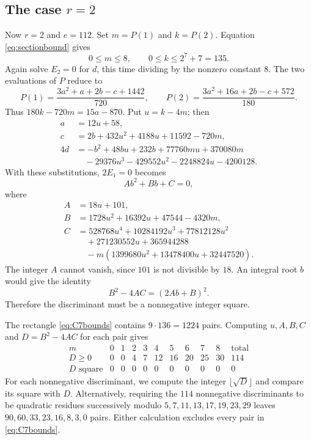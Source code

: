 \documentclass[11pt,reqno,letterpaper]{amsart}
\theoremstyle{definition}
\numberwithin{equation}{section}
\begin{document}
\subsection{The case \texorpdfstring{$r=2$}{r=2}}
Now $r=2$ and $e=112$. Set $m=P(1)$ and $k=P(2)$.
Equation \eqref{eq:sectionbound} gives
\begin{equation}\label{eq:C7bounds}
 0\le m\le8,\qquad 0\le k\le 2^7+7=135.
\end{equation}
Again solve $E_2=0$ for $d$, this time dividing by the nonzero constant $8$.
The two evaluations of $P$ reduce to
\[
 P(1)=\frac{3a^2+a+2b-c+1442}{720},\qquad
 P(2)=\frac{3a^2+16a+2b-c+572}{180}.
\]
Thus $180k-720m=15a-870$. Put $u=k-4m$; then
\begin{align*}
 a&=12u+58,\\
 c&=2b+432u^2+4188u+11592-720m,\\
 4d&=-b^2+48bu+232b+77760mu+370080m\\
    &\quad-29376u^3-429552u^2-2248824u-4200128.
\end{align*}
With these substitutions, $2E_1=0$ becomes
\begin{equation}\label{eq:C7quad}
 A b^2+B b+C=0,
\end{equation}
where
\begin{align*}
 A&=18u+101,\\
 B&=1728u^2+16392u+47544-4320m,\\
 C&=528768u^4+10284192u^3+77812128u^2\\
  &\quad+271230552u+365944288\\
  &\quad-m(1399680u^2+13478400u+32447520).
\end{align*}
The integer $A$ cannot vanish, since $101$ is not divisible by $18$.
An integral root $b$ would give the identity
\begin{equation}\label{eq:disc}
 B^2-4AC=(2Ab+B)^2.
\end{equation}
Therefore the discriminant must be a nonnegative integer square.

The rectangle \eqref{eq:C7bounds} contains $9\cdot136=1224$ pairs.
Computing $u,A,B,C$ and $D=B^2-4AC$ for each pair gives
\[
\begin{array}{c|rrrrrrrrr|r}
m&0&1&2&3&4&5&6&7&8&\text{total}\\ \hline
D\ge0&0&0&4&7&12&16&20&25&30&114\\
D\text{ square}&0&0&0&0&0&0&0&0&0&0
\end{array}
\]
For each nonnegative discriminant, we compute the integer
$\lfloor\sqrt D\rfloor$ and compare its square with $D$.
Alternatively, requiring the $114$ nonnegative discriminants to be
quadratic residues successively modulo $5,7,11,13,17,19,23,29$ leaves
$90,60,33,23,16,8,3,0$ pairs. Either calculation excludes every pair
in \eqref{eq:C7bounds}.
\end{document}
